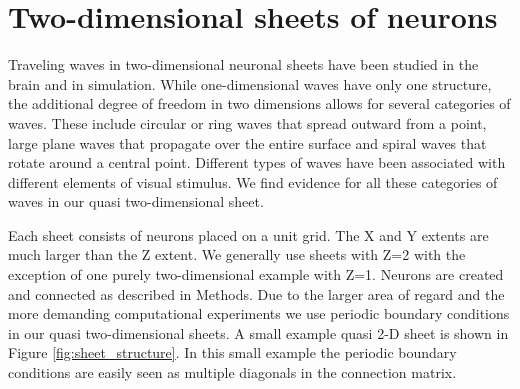 \section{Two-dimensional sheets of neurons}
Traveling waves in two-dimensional neuronal sheets have been studied in the brain \citep{huang2004}\citep{Townsend2018} and in simulation\citep{keane2015}\citep{Spreizer2019}\citep{Bhattacharya2021}.
While one-dimensional waves have only one structure, the additional degree of freedom in two dimensions allows for several categories of waves.
These include circular or ring waves that spread outward from a point, large plane waves that propagate over the entire surface and spiral waves\citep{Huang2010}\citep{Gu2013} that rotate around a central point.
Different types of waves have been associated with different elements of visual stimulus\citep{Benucci2007}.
We find evidence for all these categories of waves in our quasi two-dimensional sheet.

Each sheet consists of neurons placed on a unit grid. 
The X and Y extents are much larger than the Z extent.
We generally use sheets with Z=2 with the exception of one purely two-dimensional example with Z=1.
Neurons are created and connected as described in Methods.
Due to the larger area of regard and the more demanding computational experiments we use periodic boundary conditions in our quasi two-dimensional sheets.
A small example quasi 2-D sheet is shown in Figure \ref{fig:sheet_structure}.
In this small example the periodic boundary conditions are easily seen as multiple diagonals in the connection matrix.

